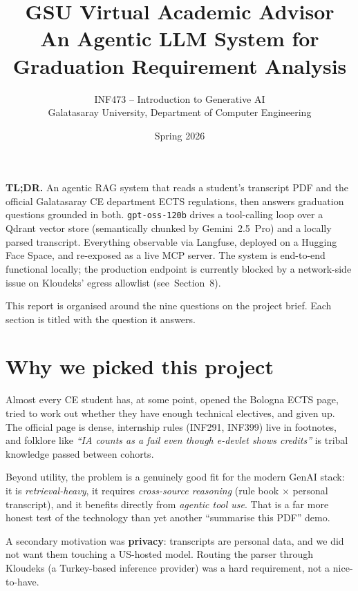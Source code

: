 \documentclass[11pt,a4paper]{article}
\title{\vspace{-1cm}\textbf{\color{gsublue}GSU Virtual Academic Advisor} \\[0.2em]
       \large An Agentic LLM System for Graduation Requirement Analysis}
\author{INF473 -- Introduction to Generative AI \\
        Galatasaray University, Department of Computer Engineering}
\date{Spring 2026}
\begin{document}
\maketitle

\vspace{-0.8em}
\begin{center}
\colorbox{softgray}{
\begin{minipage}{0.9\textwidth}
\small\textbf{TL;DR.} An agentic RAG system that reads a student's transcript PDF and
the official Galatasaray CE department ECTS regulations, then answers graduation
questions grounded in both. \texttt{gpt-oss-120b} drives a tool-calling loop over a
Qdrant vector store (semantically chunked by Gemini~2.5~Pro) and a locally parsed
transcript. Everything observable via Langfuse, deployed on a Hugging Face Space,
and re-exposed as a live MCP server. The system is end-to-end functional locally;
the production endpoint is currently blocked by a network-side issue on
Kloudeks' egress allowlist (see~Section~8).
\end{minipage}}
\end{center}

\vspace{0.5em}

This report is organised around the nine questions on the project brief. Each
section is titled with the question it answers.

\section{Why we picked this project}

Almost every CE student has, at some point, opened the Bologna ECTS page, tried to
work out whether they have enough technical electives, and given up. The official
page is dense, internship rules (INF291, INF399) live in footnotes, and folklore
like \emph{``IA counts as a fail even though e-devlet shows credits''} is tribal
knowledge passed between cohorts.

Beyond utility, the problem is a genuinely good fit for the modern GenAI stack: it
is \emph{retrieval-heavy}, it requires \emph{cross-source reasoning} (rule book
$\times$ personal transcript), and it benefits directly from \emph{agentic tool
use}. That is a far more honest test of the technology than yet another
``summarise this PDF'' demo.

A secondary motivation was \textbf{privacy}: transcripts are personal data, and we
did not want them touching a US-hosted model. Routing the parser through Kloudeks
(a Turkey-based inference provider) was a hard requirement, not a nice-to-have.
\end{document}
